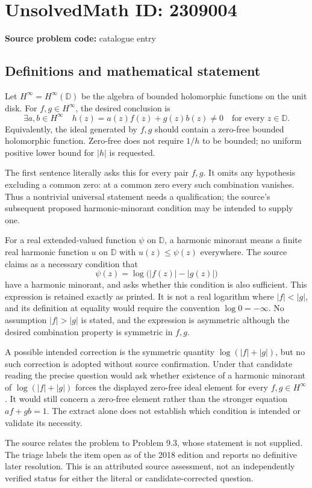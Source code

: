 \documentclass[11pt]{article}
\begin{document}
\section*{UnsolvedMath ID: 2309004}
\textbf{Source problem code:} catalogue entry
\subsection{Definitions and mathematical statement}
Let $H^\infty=H^\infty(\mathbb D)$ be the algebra of bounded holomorphic functions on the unit disk. For $f,g\in H^\infty$, the desired conclusion is
\[
\exists a,b\in H^\infty\quad
h(z)=a(z)f(z)+g(z)b(z)\ne0\quad\text{for every }z\in\mathbb D.
\]
Equivalently, the ideal generated by $f,g$ should contain a zero-free bounded holomorphic function. Zero-free does not require $1/h$ to be bounded; no uniform positive lower bound for $|h|$ is requested.

The first sentence literally asks this for every pair $f,g$. It omits any hypothesis excluding a common zero: at a common zero every such combination vanishes. Thus a nontrivial universal statement needs a qualification; the source's subsequent proposed harmonic-minorant condition may be intended to supply one.

For a real extended-valued function $\psi$ on $\mathbb D$, a harmonic minorant means a finite real harmonic function $u$ on $\mathbb D$ with $u(z)\le\psi(z)$ everywhere. The source claims as a necessary condition that
\[
\psi(z)=\log\bigl(|f(z)|-|g(z)|\bigr)
\]
have a harmonic minorant, and asks whether this condition is also sufficient. This expression is retained exactly as printed. It is not a real logarithm where $|f|<|g|$, and its definition at equality would require the convention $\log0=-\infty$. No assumption $|f|>|g|$ is stated, and the expression is asymmetric although the desired combination property is symmetric in $f,g$.

A possible intended correction is the symmetric quantity $\log(|f|+|g|)$, but no such correction is adopted without source confirmation. Under that candidate reading the precise question would ask whether existence of a harmonic minorant of $\log(|f|+|g|)$ forces the displayed zero-free ideal element for every $f,g\in H^\infty$. It would still concern a zero-free element rather than the stronger equation $af+gb=1$. The extract alone does not establish which condition is intended or validate its necessity.

The source relates the problem to Problem 9.3, whose statement is not supplied. The triage labels the item open as of the 2018 edition and reports no definitive later resolution. This is an attributed source assessment, not an independently verified status for either the literal or candidate-corrected question.
\end{document}
